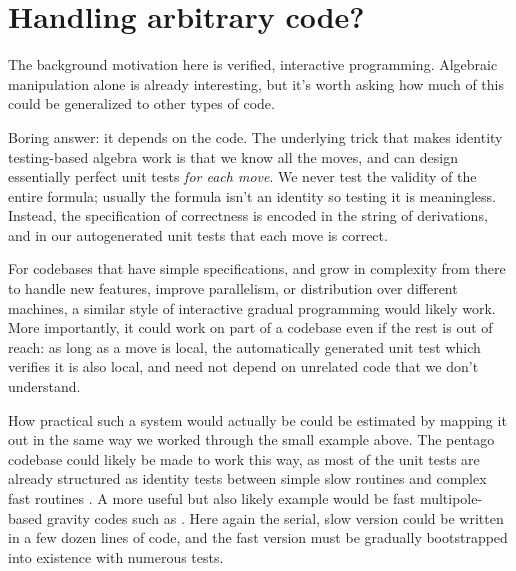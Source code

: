 \documentclass[11pt]{article}
\begin{document}
\section{Handling arbitrary code?}

The background motivation here is verified, interactive programming.  Algebraic manipulation alone is already
interesting, but it's worth asking how much of this could be generalized to other types of code.

Boring answer: it depends on the code.  The underlying trick that makes identity testing-based algebra work is that
we know all the moves, and can design essentially perfect unit tests \emph{for each move}.  We never test
the validity of the entire formula; usually the formula isn't an identity so testing it is meaningless.
Instead, the specification of correctness is encoded in the string of derivations, and in our autogenerated
unit tests that each move is correct.

For codebases that have simple specifications, and grow in complexity from there to handle new features,
improve parallelism, or distribution over different machines, a similar style of interactive gradual programming
would likely work.  More importantly, it could work on part of a codebase even if the rest is out of reach:
as long as a move is local, the automatically generated unit test which verifies it is also local, and need
not depend on unrelated code that we don't understand.

How practical such a system would actually be could be estimated by mapping it out in the same way we
worked through the small example above.  The pentago codebase could likely be made to work this
way, as most of the unit tests are already structured as identity tests between simple slow routines and complex
fast routines \cite{irving2014pentago}.  A more useful but also likely example would be fast multipole-based
gravity codes such as \cite{warren20132hot}.  Here again the serial, slow version could be written in a few dozen
lines of code, and the fast version must be gradually bootstrapped into existence with numerous tests.



\end{document}
